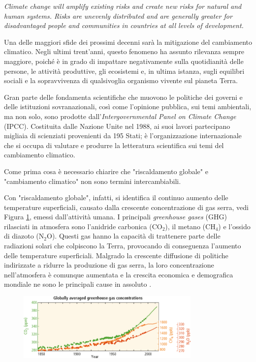 \begin{displayquote}
\small\singlespacing\textit{Climate change will amplify existing risks and create new risks for natural and human systems. Risks are unevenly distributed and are generally greater for disadvantaged people and communities in countries at all levels of development.} \parencite{IPCC:2014}
\end{displayquote}

Una delle maggiori sfide dei prossimi decenni sarà la mitigazione del cambiamento climatico. Negli ultimi trent'anni, questo fenomeno ha assunto rilevanza sempre maggiore, poiché è in grado di impattare negativamente sulla quotidianità delle persone, le attività produttive, gli ecosistemi e, in ultima istanza, sugli equilibri sociali e la sopravvivenza di qualsivoglia organismo vivente sul pianeta Terra.

Gran parte delle fondamenta scientifiche che muovono le politiche dei governi e delle istituzioni sovranazionali, così come l'opinione pubblica, sui temi ambientali, ma non solo, sono prodotte dall'\textit{Intergovernmental Panel on Climate Change} (IPCC). Costituita dalle Nazione Unite nel 1988, ai suoi lavori partecipano migliaia di scienziati provenienti da 195 Stati; è l'organizzazione internazionale che si occupa di valutare e produrre la letteratura scientifica sui temi del cambiamento climatico.

Come prima cosa è necessario chiarire che "riscaldamento globale" e "cambiamento climatico" non sono termini intercambiabili.

Con "riscaldamento globale", infatti, si identifica il continuo aumento delle temperature superficiali, causato dalla crescente concentrazione di gas serra, vedi Figura \ref{fig-ghg_concentration}, emessi dall'attività umana. I principali \textit{greenhouse gases} (GHG) rilasciati in atmosfera sono l'anidride carbonica ($\mathrm{CO_2}$), il metano ($\mathrm{CH_4}$) e l'ossido di diazoto ($\mathrm{N_2O}$). Questi gas hanno la capacità di trattenere parte delle radiazioni solari che colpiscono la Terra, provocando di conseguenza l'aumento delle temperature superficiali. Malgrado la crescente diffusione di politiche indirizzate a ridurre la produzione di gas serra, la loro concentrazione nell'atmosfera è comunque aumentata e la crescita economica e demografica mondiale ne sono le principali cause in assoluto \parencite{IPCC:2014}.

\begin{figure}
	\centering
	\includegraphics[width=0.80\textwidth]{img/ghg_concentration.pdf}
	\caption{}
	\label{fig-ghg_concentration}
\end{figure}

